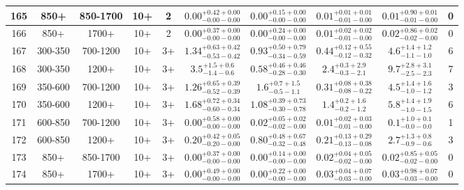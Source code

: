 \documentclass[11pt, oneside]{article}
\begin{document}
\begin{table}
{\begin{tabular}{ |c|c|c|c|c||c|c|c||c|c| }
165 & 850+ & 850-1700 & 10+ & 2 & $0.00^{+0.42+0.00}_{-0.00-0.00}$ & $0.00^{+0.15+0.00}_{-0.00-0.00}$ & $0.01^{+0.01+0.01}_{-0.01-0.00}$ & $0.01^{+0.90+0.01}_{-0.01-0.00}$ & 0 \\ \hline
166 & 850+ & 1700+ & 10+ & 2 & $0.00^{+0.37+0.00}_{-0.00-0.00}$ & $0.00^{+0.24+0.00}_{-0.00-0.00}$ & $0.01^{+0.02+0.02}_{-0.01-0.00}$ & $0.02^{+0.86+0.02}_{-0.02-0.00}$ & 0 \\ \hline
167 & 300-350 & 700-1200 & 10+ & 3+ & $1.34^{+0.63+0.42}_{-0.53-0.42}$ & $0.93^{+0.50+0.79}_{-0.34-0.59}$ & $0.44^{+0.12+0.55}_{-0.12-0.32}$ & $4.6^{+1.4+1.2}_{-1.1-1.0}$ & 6 \\ \hline
168 & 300-350 & 1200+ & 10+ & 3+ & $3.5^{+1.5+0.6}_{-1.4-0.6}$ & $0.58^{+0.46+0.46}_{-0.28-0.30}$ & $2.4^{+0.3+2.9}_{-0.3-2.1}$ & $9.7^{+2.8+3.1}_{-2.5-2.3}$ & 7 \\ \hline
169 & 350-600 & 700-1200 & 10+ & 3+ & $1.26^{+0.65+0.39}_{-0.52-0.39}$ & $1.6^{+0.7+1.5}_{-0.5-1.1}$ & $0.31^{+0.08+0.38}_{-0.08-0.22}$ & $4.5^{+1.4+1.6}_{-1.0-1.2}$ & 3 \\ \hline
170 & 350-600 & 1200+ & 10+ & 3+ & $1.68^{+0.72+0.34}_{-0.60-0.34}$ & $1.08^{+0.39+0.73}_{-0.30-0.78}$ & $1.4^{+0.2+1.6}_{-0.2-1.2}$ & $5.8^{+1.4+1.9}_{-1.0-1.5}$ & 6 \\ \hline
171 & 600-850 & 700-1200 & 10+ & 3+ & $0.00^{+0.58+0.00}_{-0.00-0.00}$ & $0.02^{+0.05+0.02}_{-0.02-0.00}$ & $0.01^{+0.02+0.03}_{-0.01-0.00}$ & $0.1^{+1.0+0.1}_{-0.0-0.0}$ & 1 \\ \hline
172 & 600-850 & 1200+ & 10+ & 3+ & $0.20^{+0.42+0.05}_{-0.20-0.00}$ & $0.80^{+0.48+0.67}_{-0.32-0.48}$ & $0.21^{+0.13+0.29}_{-0.13-0.08}$ & $2.7^{+1.3+0.8}_{-0.9-0.6}$ & 3 \\ \hline
173 & 850+ & 850-1700 & 10+ & 3+ & $0.00^{+0.37+0.00}_{-0.00-0.00}$ & $0.00^{+0.14+0.00}_{-0.00-0.00}$ & $0.02^{+0.04+0.05}_{-0.02-0.00}$ & $0.02^{+0.85+0.05}_{-0.02-0.00}$ & 0 \\ \hline
174 & 850+ & 1700+ & 10+ & 3+ & $0.00^{+0.49+0.00}_{-0.00-0.00}$ & $0.00^{+0.22+0.00}_{-0.00-0.00}$ & $0.03^{+0.04+0.07}_{-0.03-0.00}$ & $0.03^{+0.98+0.07}_{-0.03-0.00}$ & 0 \\ \hline
\end{tabular}}
\end{table}
\end{document}

